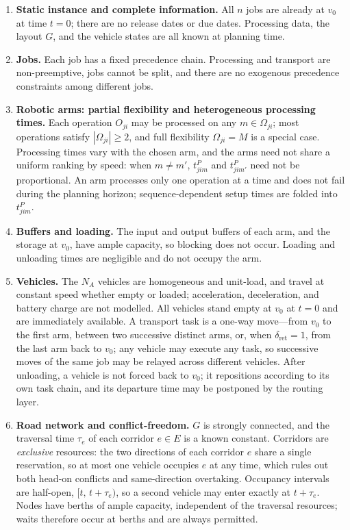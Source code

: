 \begin{enumerate}[label=\textbf{A\arabic*.},leftmargin=*,topsep=2pt,itemsep=2pt]
\item \textbf{Static instance and complete information.} All $n$ jobs are already at $v_0$ at time $t=0$; there are no release dates or due dates. Processing data, the layout $G$, and the vehicle states are all known at planning time.

\item \textbf{Jobs.} Each job has a fixed precedence chain. Processing and transport are non-preemptive, jobs cannot be split,
and there are no exogenous precedence constraints among different jobs.

\item \textbf{Robotic arms: partial flexibility and heterogeneous processing times.} Each operation $O_{ji}$ may be processed on any
$m\in\Omega_{ji}$; most operations satisfy $|\Omega_{ji}|\ge 2$, and full flexibility
$\Omega_{ji}=M$ is a special case. Processing times vary with the chosen arm, and the arms need not share a uniform ranking by speed: when
$m\neq m'$, $t^P_{jim}$ and $t^P_{jim'}$ need not be proportional. An arm processes only
one operation at a time and does not fail during the planning horizon; sequence-dependent setup times are folded into $t^P_{jim}$.

\item \textbf{Buffers and loading.} The input and output buffers of each arm, and the storage at $v_0$, have ample capacity,
so blocking does not occur. Loading and unloading times are negligible and do not occupy the arm.

\item \textbf{Vehicles.} The $N_A$ vehicles are homogeneous and unit-load, and travel at constant speed whether empty or loaded; acceleration, deceleration, and
battery charge are not modelled. All vehicles stand empty at $v_0$ at $t=0$ and are immediately available. A transport task is a one-way move---from $v_0$
to the first arm, between two successive distinct arms, or, when $\delta_{\mathrm{ret}}=1$, from the last arm
back to $v_0$; any vehicle may execute any task,
so successive moves of the same job may be relayed across different vehicles. After unloading, a vehicle is not forced back to $v_0$; it
repositions according to its own task chain, and its departure time may be postponed by the routing layer.

\item \textbf{Road network and conflict-freedom.} $G$ is strongly connected, and the traversal time $\tau_e$ of each corridor $e\in E$ is a known constant. Corridors are
\emph{exclusive} resources: the two directions of each corridor $e$ share a single reservation, so at most one vehicle occupies $e$ at any time, which rules out
both head-on conflicts and same-direction overtaking. Occupancy intervals are half-open, $[t,\,t+\tau_e)$, so a second vehicle may enter exactly at
$t+\tau_e$. Nodes have berths of ample capacity, independent of the traversal resources; waits therefore occur at berths
and are always permitted.


\end{enumerate}
